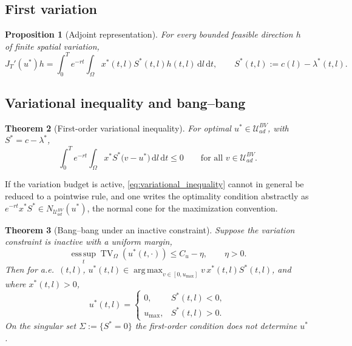 \documentclass[pdflatex,sn-mathphys-num]{sn-jnl}
\newcommand{\Om}{\Omega}
\newcommand{\dd}{\,\mathrm{d}}
\newcommand{\UadBV}{\mathcal{U}_{ad}^{BV}}
\DeclareMathOperator*{\argmax}{arg\,max}
\DeclareMathOperator{\TV}{TV}
\theoremstyle{plain}
\newtheorem{theorem}{Theorem}[section]
\newtheorem{proposition}[theorem]{Proposition}
\theoremstyle{definition}
\theoremstyle{remark}
\begin{document}
\subsection{First variation}
\label{subsec:adjoint_identity}

\begin{proposition}[Adjoint representation]
\label{prop:gradient_formula}
For every bounded feasible direction $h$ of finite spatial variation,
\[
J_T'(u^*)h
=
\int_0^T e^{-rt}\int_\Om x^*(t,l)S^*(t,l)h(t,l)\dd l\dd t,
\qquad
S^*(t,l):=c(l)-\lambda^*(t,l).
\]
\end{proposition}

\subsection{Variational inequality and bang--bang}
\label{subsec:variational_inequality}

\begin{theorem}[First-order variational inequality]
\label{thm:variational_inequality}
For optimal $u^*\in\UadBV$, with $S^*=c-\lambda^*$,
\begin{equation}\label{eq:variational_inequality}
\int_0^T e^{-rt}\int_\Om x^*S^*\big(v-u^*\big)\dd l\dd t\le0
\qquad\text{for all }v\in\UadBV.
\end{equation}
\end{theorem}

If the variation budget is active, \eqref{eq:variational_inequality} cannot in
general be reduced to a pointwise rule, and one writes the optimality condition
abstractly as $e^{-rt}x^*S^*\in N_{\UadBV}(u^*)$, the normal cone for the
maximization convention.

\begin{theorem}[Bang--bang under an inactive constraint]
\label{thm:bang_bang}
Suppose the variation constraint is inactive with a uniform margin,
\begin{equation}\label{eq:inactive_BV}
\operatorname*{ess\,sup}_{t}\TV_\Om(u^*(t,\cdot))\le C_u-\eta,\qquad\eta>0.
\end{equation}
Then for a.e.\ $(t,l)$,
$u^*(t,l)\in\argmax_{v\in[0,u_{\max}]}v\,x^*(t,l)S^*(t,l)$, and where
$x^*(t,l)>0$,
\begin{equation}\label{eq:bang_bang_rule}
u^*(t,l)=
\begin{cases}
0, & S^*(t,l)<0,\\
u_{\max}, & S^*(t,l)>0.
\end{cases}
\end{equation}
On the singular set $\Sigma:=\{S^*=0\}$ the first-order condition does not
determine $u^*$.
\end{theorem}
\end{document}
